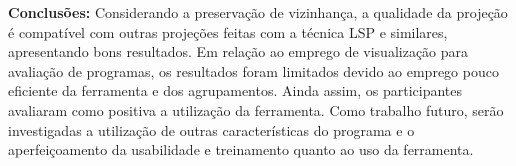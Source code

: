 \begin{resumo}
\textbf{Conclusões:} 
Considerando a preservação de vizinhança, a qualidade da projeção é compatível
com outras projeções feitas com a técnica LSP e similares, apresentando bons
resultados. Em relação ao emprego de visualização para avaliação de programas,
os resultados foram limitados devido ao emprego pouco eficiente da ferramenta
e dos agrupamentos. Ainda assim, os participantes avaliaram como positiva a
utilização da ferramenta. Como trabalho futuro, serão investigadas a utilização
de outras características do programa e o aperfeiçoamento da usabilidade e
treinamento quanto ao uso da ferramenta.

\end{resumo}



